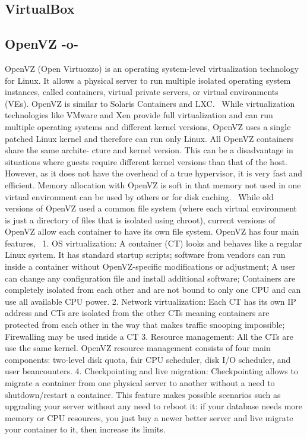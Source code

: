 \subsection{VirtualBox}

\pv 

\subsection{OpenVZ -o-}

OpenVZ (Open Virtuozzo) is an operating system-level virtualization
technology for Linux. It allows a physical server to run multiple
isolated operating system instances, called containers, virtual
private servers, or virtual environments (VEs). OpenVZ is similar to
Solaris Containers and LXC.~\cite{www-openvz-3} While virtualization
technologies like VMware and Xen provide full virtualization and can
run multiple operating systems and different kernel versions, OpenVZ
uses a single patched Linux kernel and therefore can run only
Linux. All OpenVZ containers share the same archite- cture and kernel
version. This can be a disadvantage in situations where guests require
different kernel versions than that of the host. However, as it does
not have the overhead of a true hypervisor, it is very fast and
efficient. Memory allocation with OpenVZ is soft in that memory not
used in one virtual environment can be used by others or for disk
caching.~\cite{www-openvz-2} While old versions of OpenVZ used a
common file system (where each virtual environment is just a directory
of files that is isolated using chroot), current versions of OpenVZ
allow each container to have its own file system.  OpenVZ has four
main features,~\cite{www-openvz-1} 1. OS virtualization: A container
(CT) looks and behaves like a regular Linux system. It has standard
startup scripts; software from vendors can run inside a container
without OpenVZ-specific modifications or adjustment; A user can change
any configuration file and install additional software; Containers are
completely isolated from each other and are not bound to only one CPU
and can use all available CPU power.  2. Network virtualization: Each
CT has its own IP address and CTs are isolated from the other CTs
meaning containers are protected from each other in the way that makes
traffic snooping impossible; Firewalling may be used inside a CT
3. Resource management: All the CTs are use the same kernel. OpenVZ
resource management consists of four main components: two-level disk
quota, fair CPU scheduler, disk I/O scheduler, and user beancounters.
4. Checkpointing and live migration: Checkpointing allows to migrate a
container from one physical server to another without a need to
shutdown/restart a container. This feature makes possible scenarios
such as upgrading your server without any need to reboot it: if your
database needs more memory or CPU resources, you just buy a newer
better server and live migrate your container to it, then increase its
limits.


